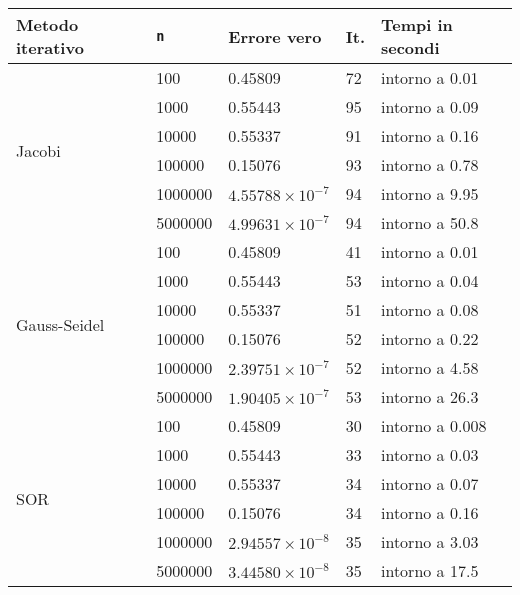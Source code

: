 \documentclass[12pt]{article}
\begin{document}
\begin{table}[h!]
    \begin{center}
        \label{tab:metodi}
        \begin{tabular}{p{2.2cm}|p{2cm}|p{2.5cm}|p{0.5cm}|p{3cm}}
            \toprule
            \textbf{Metodo iterativo} & \texttt{n} & \textbf{Errore vero} & \textbf{It.} & \textbf{Tempi in secondi}\\
            \midrule
            \multirow{6}{*}{Jacobi} & 100 & 0.45809 & 72 & intorno a 0.01 \\
            & 1000 & 0.55443 & 95 & intorno a 0.09\\
            & 10000 & 0.55337 & 91 & intorno a 0.16 \\
            & 100000 & 0.15076 & 93 & intorno a 0.78 \\
            & 1000000 & \(4.55788\times10^{-7}\) & 94 & intorno a 9.95\\
            & 5000000 & \(4.99631\times10^{-7}\) & 94 & intorno a 50.8 \\
            \midrule
            \multirow{6}{*}{Gauss-Seidel} & 100 & 0.45809 & 41 & intorno a 0.01 \\
            & 1000 & 0.55443 & 53 & intorno a 0.04 \\
            & 10000 & 0.55337 & 51 & intorno a 0.08 \\
            & 100000 & 0.15076 & 52 & intorno a 0.22 \\
            & 1000000 & \(2.39751\times10^{-7}\) & 52 & intorno a 4.58 \\
            & 5000000 & \(1.90405\times10^{-7}\) & 53 & intorno a 26.3 \\
            \midrule
            \multirow{6}{*}{SOR} & 100 & 0.45809 & 30 & intorno a 0.008 \\
            & 1000 & 0.55443 & 33 & intorno a 0.03 \\
            & 10000 & 0.55337 & 34 & intorno a 0.07 \\
            & 100000 & 0.15076 & 34 & intorno a 0.16 \\
            & 1000000 & \(2.94557\times10^{-8}\) & 35 & intorno a 3.03 \\
            & 5000000 & \(3.44580\times10^{-8}\) & 35 & intorno a 17.5 \\ 
            \bottomrule
        \end{tabular}
    \end{center}
\end{table}
\clearpage
\newpage
\end{document}
